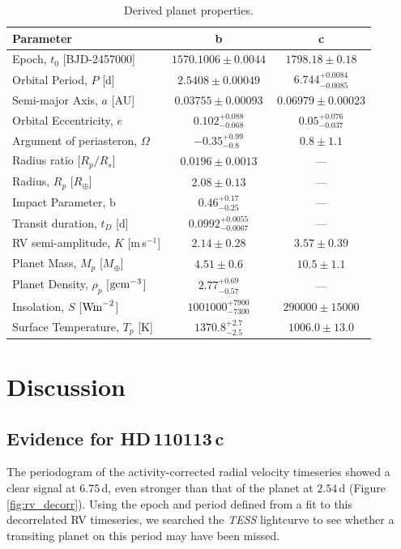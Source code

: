 \documentclass[fleqn,usenatbib]{mnras}
\newcommand{\tess}{{\it TESS}}
\newcommand{\ms}{m\,s$^{-1}$}
\newcommand{\Tplanetc}{HD\,110113\,c}
\begin{document}
\begin{table}
	\centering
	\caption{Derived planet properties.}
	\label{tab:derived_pars}
\begin{tabular}{lcc}
\hline
\hline
Parameter & b & c\\
\hline
\hline
Epoch, $t_0$ [BJD-2457000] &  $ 1570.1006 \pm 0.0044 $  &  $ 1798.18 \pm 0.18 $  \\
Orbital Period, $P$ [d] &  $ 2.5408 \pm 0.00049 $  &  $ 6.744^{+0.0084}_{-0.0085} $  \\
Semi-major Axis, $a$ [AU] &  $ 0.03755 \pm 0.00093 $  &  $ 0.06979 \pm 0.00023 $  \\
Orbital Eccentricity, $e$ &  $ 0.102^{+0.088}_{-0.068} $  &  $ 0.05^{+0.076}_{-0.037} $  \\
Argument of periasteron, $\Omega$ &  $ -0.35^{+0.99}_{-0.8} $  &  $ 0.8 \pm 1.1 $  \\
Radius ratio [$R_p/R_s$] &  $ 0.0196 \pm 0.0013 $  & --- \\
Radius, $R_p$ [$R_\oplus$] &  $ 2.08 \pm 0.13 $  & --- \\
Impact Parameter, b &  $ 0.46^{+0.17}_{-0.25} $  & --- \\
Transit duration, $t_D$ [d] &  $ 0.0992^{+0.0055}_{-0.0067} $  & --- \\
RV semi-amplitude, $K$ [\ms{}] &  $ 2.14 \pm 0.28 $  &  $ 3.57 \pm 0.39 $  \\
Planet Mass, $M_p$ [$M_\oplus$] &  $ 4.51 \pm 0.6 $  &  $ 10.5 \pm 1.1 $  \\
Planet Density, $\rho_p$ [${\rm gcm}^{-3}$] &  $ 2.77^{+0.69}_{-0.57} $  & --- \\
Insolation, $S$ [${\rm Wm}^{-2}$] &  $ 1001000^{+7900}_{-7300} $  &  $ 290000 \pm 15000 $  \\
Surface Temperature, $T_p$ [K] &  $ 1370.8^{+2.7}_{-2.5} $  &  $ 1006.0 \pm 13.0 $  \\
\hline
\hline
\end{tabular}
\end{table}

\section{Discussion}\label{sect:discus}

\subsection{Evidence for \Tplanetc{}}\label{sect:planetc}
The periodogram of the activity-corrected radial velocity timeseries showed a clear signal at $6.75$\,d, even stronger than that of the planet at $2.54$\,d (Figure \ref{fig:rv_decorr}).
Using the epoch and period defined from a fit to this decorrelated RV timeseries, we searched the \tess{} lightcurve to see whether a transiting planet on this period may have been missed.
\end{document}
